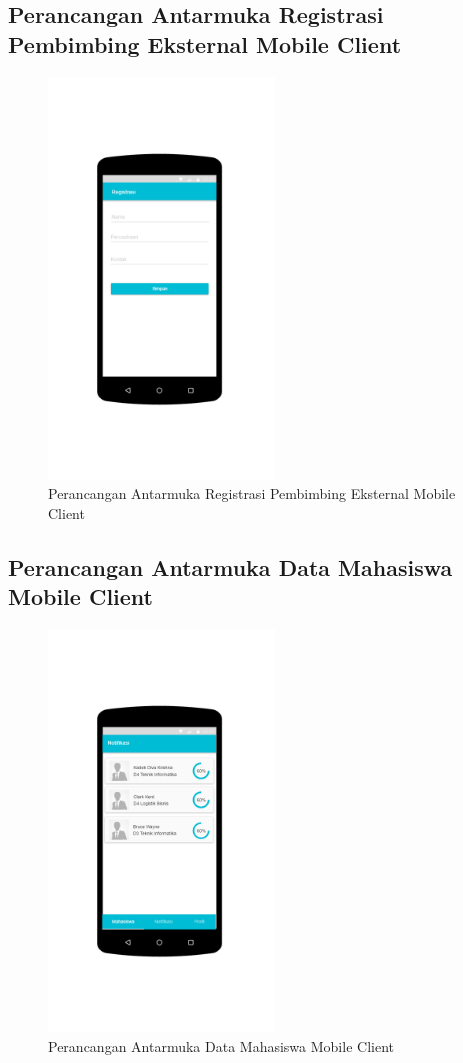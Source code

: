 \subsection{Perancangan Antarmuka Registrasi Pembimbing Eksternal  Mobile Client }
	\begin{figure}[H]
		\includegraphics[width=6cm]{figures/diagram/image128.png}
		\centering
		\caption{Perancangan Antarmuka Registrasi Pembimbing Eksternal Mobile Client}
	\end{figure}
\subsection{Perancangan Antarmuka Data Mahasiswa Mobile Client }
	\begin{figure}[H]
		\includegraphics[width=6cm]{figures/diagram/image129.png}
		\centering
		\caption{Perancangan Antarmuka Data Mahasiswa Mobile Client}
	\end{figure}
